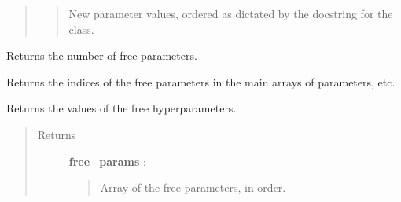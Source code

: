 \documentclass[letterpaper,10pt,english]{sphinxmanual}
\begin{document}
\begin{fulllineitems}
\begin{fulllineitems}
\begin{quote}
\begin{description}
\begin{quote}
New parameter values, ordered as dictated by the docstring for the
class.
\end{quote}

\end{description}\end{quote}

\end{fulllineitems}


\begin{fulllineitems}
\label{gptools.kernel:gptools.kernel.warping.WarpingFunction.num_free_params}
Returns the number of free parameters.

\end{fulllineitems}


\begin{fulllineitems}
\label{gptools.kernel:gptools.kernel.warping.WarpingFunction.free_param_idxs}
Returns the indices of the free parameters in the main arrays of parameters, etc.

\end{fulllineitems}


\begin{fulllineitems}
\label{gptools.kernel:gptools.kernel.warping.WarpingFunction.free_params}
Returns the values of the free hyperparameters.
\begin{quote}\begin{description}
\item[{Returns}] \leavevmode
\textbf{free\_params} : 
\begin{quote}

Array of the free parameters, in order.
\end{quote}

\end{description}\end{quote}

\end{fulllineitems}



\end{fulllineitems}
\end{document}

